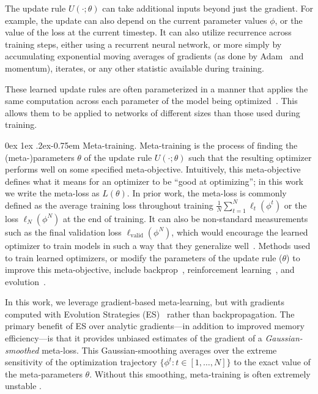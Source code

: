 \documentclass[11pt]{article}
\makeatletter
\renewcommand{\paragraph}{%
  \@startsection{paragraph}{4}%
  {\z@}{0ex \@plus 1ex \@minus .2ex}{-0.75em}%
  {\normalfont\normalsize\bfseries}%
}
\makeatother
\begin{document}
The update rule $U(\cdot; \theta)$ can take additional inputs beyond just the gradient. 
For example, the update can also depend on the current parameter values $\phi$, or the value of the loss at the current timestep.
It can also utilize recurrence across training steps, either using a recurrent neural network, or more simply by accumulating exponential moving averages of gradients (as done by Adam~\citep{kingma2014adam} and momentum), iterates, or any other statistic available during training. 

These learned update rules are often parameterized in a manner that applies the same computation across each parameter of the model being optimized~\citep{andrychowicz2016learning, metz2019understanding}.
This allows them to be applied to networks of different sizes than those used during training.

\paragraph{Meta-training.} Meta-training is the process of finding the (meta-)parameters $\theta$ of the update rule $U(\cdot; \theta)$ such that the resulting optimizer performs well on some specified meta-objective.
Intuitively, this meta-objective defines what it means for an optimizer to be ``good at optimizing''; in this work we write the meta-loss as $L(\theta)$.
In prior work, the meta-loss is commonly defined as the average training loss throughout training $\frac{1}{N}\sum_{t=1}^N \ell_t(\phi^t)$ or the loss $\ell_N(\phi^N)$ at the end of training.
It can also be non-standard measurements such as the final validation loss $\ell_\text{valid}(\phi^N)$, which would encourage the learned optimizer to train models in such a way that they generalize well~\citep{metz2019understanding}.
Methods used to train learned optimizers, or modify the parameters of the update rule ($\theta$) to improve this meta-objective, include  backprop~\citep{andrychowicz2016learning}, reinforcement learning~\citep{li2016learning, li2017learning}, and evolution~\citep{metz2019understanding, metz2020tasks, metz2021training}.

In this work, we leverage gradient-based meta-learning, but with gradients computed with Evolution Strategies (ES)~\citep{rechenberg1973evolutionsstrategie, nesterov2011random, salimans2017evolution} rather than backpropagation.
The primary benefit of ES over analytic gradients---in addition to improved memory efficiency---is that it provides unbiased estimates of the gradient of a \emph{Gaussian-smoothed} meta-loss.
This Gaussian-smoothing averages over the extreme sensitivity of the optimization trajectory $\{\phi^t : t \in [1,\dots,N]\}$ to the exact value of the meta-parameters $\theta$.
Without this smoothing, meta-training is often extremely unstable \citep{metz2019understanding}.
\end{document}
